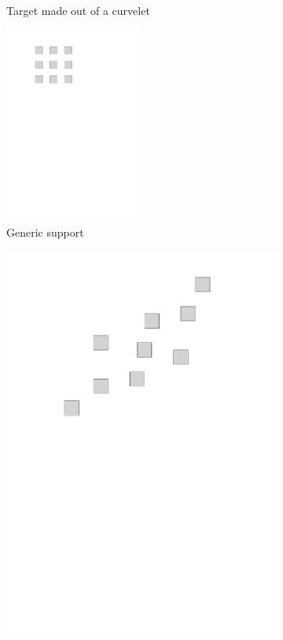 \begin{figure}[!ht]
\begin{subfigure}[b]{0.32\textwidth}
	\caption{Target made out of a curvelet}\label{fig_fixed_vs_expected_y}
\end{subfigure}
\begin{subfigure}[b]{0.32\textwidth}\centering
	\includegraphics[width=0.5\textwidth]{figures/manual-better-support/support.pdf}
	\caption{Generic support}
\end{subfigure}
\begin{subfigure}[b]{0.32\textwidth}\centering
	\includegraphics[width=\textwidth]{figures/manual-better-support/support-better.pdf}

\end{subfigure}
\end{figure}
